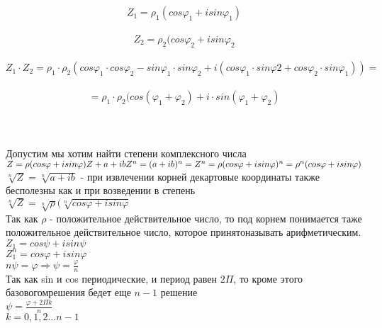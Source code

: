  \\

 \\
\[Z_{1} = \rho_{1} (cos\varphi_{1} + isin\varphi_{1})\] \\
\[Z_{2} = \rho_{2} (cos\varphi_{2} + isin\varphi_{2}\] \\
\[Z_{1} \cdot Z_{2} = \rho_{1} \cdot \rho_{2}
(cos\varphi_{1} \cdot cos\varphi_
{2} - sin\varphi_{1} \cdot sin\varphi_{2} + i(cos\varphi_{1}
\cdot sin\varphi{2}
+ cos\varphi_{2} \cdot sin\varphi_{1})) = \] \\
\[ = \rho_{1} \cdot \rho_{2} (cos(\varphi_{1} + \varphi_{2})
+ i \cdot sin
(\varphi_{1} + \varphi_{2})\] \\

 \\
 \\
Допустим мы хотим найти степени комплексного числа \\
$Z = \rho(cos\varphi + isin\varphi) \\
Z + a + ib \\
Z^n = (a + ib)^n = Z^n = \rho (cos\varphi + isin\varphi)^n =
\rho^n(cos\varphi + isin\varphi)$ \\

$\sqrt[n]{Z} = \sqrt[n]{a + ib}$ - при извлечении корней
декартовые координаты также бесполезны как и при возведении в степень \\
$\sqrt[n]{Z} = \sqrt[n]{\rho}(\sqrt[n]{cos\varphi + isin\varphi}$ \\

Так как $\rho$ - положительное действительное число, то под корнем понимается
таже положительное действительное число, которое принятоназывать
арифметическим.\\
$Z_{1} = cos\psi + isin\psi$ \\
$Z_{1}^n = cos\varphi + isin\varphi$ \\
$n\psi = \varphi \Rightarrow \psi = \frac{\varphi}{n}$ \\

Так как sin и cos периодические, и период равен $2\Pi$, то
кроме этого базовогомрешения бедет еще $n - 1$ решение \\
$\psi = \frac {\varphi + 2\Pi k}{n}$ \\
$k = 0, 1, 2 ... n - 1$ \\

